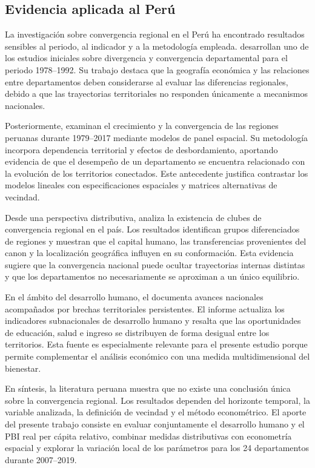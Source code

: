 \subsection{Evidencia aplicada al Perú}

La investigación sobre convergencia regional en el Perú ha encontrado
resultados sensibles al periodo, al indicador y a la metodología empleada.
\textcite{gonzales_trelles2004} desarrollan uno de los estudios iniciales sobre
divergencia y convergencia departamental para el periodo 1978--1992. Su trabajo
destaca que la geografía económica y las relaciones entre departamentos deben
considerarse al evaluar las diferencias regionales, debido a que las
trayectorias territoriales no responden únicamente a mecanismos nacionales.

Posteriormente, \textcite{palomino_rodriguez2019} examinan el crecimiento y la
convergencia de las regiones peruanas durante 1979--2017 mediante modelos de
panel espacial. Su metodología incorpora dependencia territorial y efectos de
desbordamiento, aportando evidencia de que el desempeño de un departamento se
encuentra relacionado con la evolución de los territorios conectados. Este
antecedente justifica contrastar los modelos lineales con especificaciones
espaciales y matrices alternativas de vecindad.

Desde una perspectiva distributiva, \textcite{pazparedes2023} analiza la
existencia de clubes de convergencia regional en el país. Los resultados
identifican grupos diferenciados de regiones y muestran que el capital humano,
las transferencias provenientes del canon y la localización geográfica influyen
en su conformación. Esta evidencia sugiere que la convergencia nacional puede
ocultar trayectorias internas distintas y que los departamentos no
necesariamente se aproximan a un único equilibrio.

En el ámbito del desarrollo humano, el \textcite{pnud2019} documenta avances
nacionales acompañados por brechas territoriales persistentes. El informe
actualiza los indicadores subnacionales de desarrollo humano y resalta que las
oportunidades de educación, salud e ingreso se distribuyen de forma desigual
entre los territorios. Esta fuente es especialmente relevante para el presente
estudio porque permite complementar el análisis económico con una medida
multidimensional del bienestar.

En síntesis, la literatura peruana muestra que no existe una conclusión única
sobre la convergencia regional. Los resultados dependen del horizonte temporal,
la variable analizada, la definición de vecindad y el método econométrico. El
aporte del presente trabajo consiste en evaluar conjuntamente el desarrollo
humano y el PBI real per cápita relativo, combinar medidas distributivas con
econometría espacial y explorar la variación local de los parámetros para los
24 departamentos durante 2007--2019.
